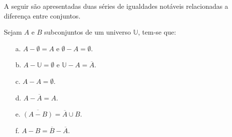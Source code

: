 A seguir são apresentadas duas séries de igualdades notáveis relacionadas a diferença entre conjuntos.

\begin{theorem}\label{teo:ElementarDiferencaConjuntos1}
	Sejam $A$ e $B$ subconjuntos de um universo $\mathbb{U}$, tem-se que:
	\begin{itemize}
		\item[a.] $A - \emptyset = A$ e $\emptyset - A = \emptyset$.
		\item[b.] $A - \mathbb{U} = \emptyset$ e $\mathbb{U} - A = \overline{A}$.
		\item[c.] $A - A = \emptyset$.
		\item[d.] $A - \overline{A} = A$.
		\item[e.] $\overline{(A - B)} = \overline{A} \cup B$.
		\item[f.] $A - B = \overline{B} - \overline{A}$.
	\end{itemize}
\end{theorem}

